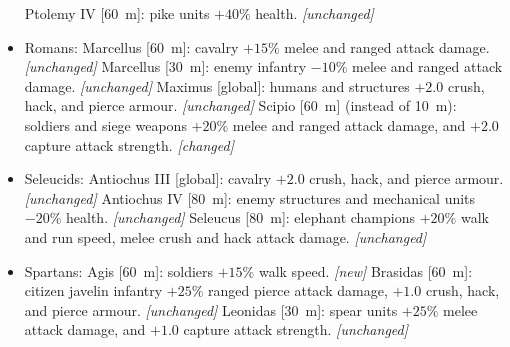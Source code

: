 \documentclass{article}
\begin{document}
\begin{itemize}
  \subitem Ptolemy IV [60~m]: pike units $+40\%$ health. \emph{[unchanged]}
  \item Romans:
  \subitem Marcellus [60~m]: cavalry $+15\%$ melee and ranged attack damage. \emph{[unchanged]}
  \subitem Marcellus [30~m]: enemy infantry $-10\%$ melee and ranged attack damage. \emph{[unchanged]}
  \subitem Maximus [global]: humans and structures $+2.0$ crush, hack, and pierce armour. \emph{[unchanged]}
  \subitem Scipio [60~m] (instead of 10~m): soldiers and siege weapons $+20\%$ melee and ranged attack damage, and $+2.0$ capture attack strength. \emph{[changed]}
  \item Seleucids:
  \subitem Antiochus III [global]: cavalry $+2.0$ crush, hack, and pierce armour. \emph{[unchanged]}
  \subitem Antiochus IV [80~m]: enemy structures and mechanical units $-20\%$ health. \emph{[unchanged]}
  \subitem Seleucus [80~m]: elephant champions $+20\%$ walk and run speed, melee crush and hack attack damage. \emph{[unchanged]}
  \item Spartans:
  \subitem Agis [60~m]: soldiers $+15\%$ walk speed. \emph{[new]}
  \subitem Brasidas [60~m]: citizen javelin infantry $+25\%$ ranged pierce attack damage, $+1.0$ crush, hack, and pierce armour. \emph{[unchanged]}
  \subitem Leonidas [30~m]: spear units $+25\%$ melee attack damage, and $+1.0$ capture attack strength. \emph{[unchanged]}
\end{itemize}
\end{document}

